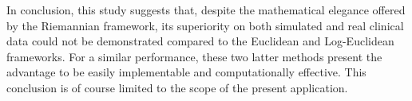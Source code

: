 In conclusion, this study suggests that, despite the mathematical elegance offered by the Riemannian framework, its superiority on both simulated and real clinical data could not be demonstrated compared to the Euclidean and Log-Euclidean frameworks. 
For a similar performance, these two latter methods present the advantage to be easily implementable and computationally effective. This conclusion is of course limited to the scope of the present application. 
